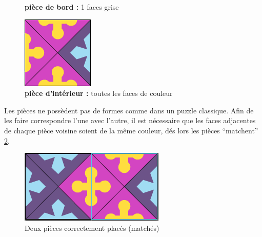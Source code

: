 \begin{figure}[H]
	   	\caption{\textbf{pièce de bord :} 1 faces grise}\label{fig:piece_bord}
	   	\endminipage\hfill
	   	\includegraphics[width=\linewidth]{images/piece_interieure.png}
	   	\caption{\textbf{pièce d'intérieur :} toutes les faces de couleur}\label{fig:piece_interieure}
	   	\endminipage
	\end{figure}

	Les pièces ne possèdent pas de formes comme dans un puzzle classique. Afin de les faire correspondre l'une avec l'autre, il est nécessaire que les faces adjacentes de chaque pièce voisine soient de la même couleur, dés lors les pièces \enquote{matchent} \ref{fig:matching}.
	
	\begin{figure}[H]
		\centering
		\includegraphics{images/matching_pieces.png}
		\caption{Deux pièces correctement placés (matchés)}\label{fig:matching}
	\end{figure}
	
